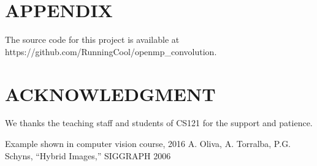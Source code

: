 \documentclass[letterpaper, 10 pt, conference]{ieeeconf}  %
\begin{document}
\addtolength{\textheight}{-12cm}   %







\section*{APPENDIX}

The source code for this project is available at https://github.com/RunningCool/openmp\_convolution.

\section*{ACKNOWLEDGMENT}

We thanks the teaching staff and students of CS121 for the support and patience.






\begin{thebibliography}{99}

 Example shown in computer vision course, 2016
 A. Oliva, A. Torralba, P.G. Schyns, 
“Hybrid Images,” SIGGRAPH 2006





\end{thebibliography}
\end{document}
